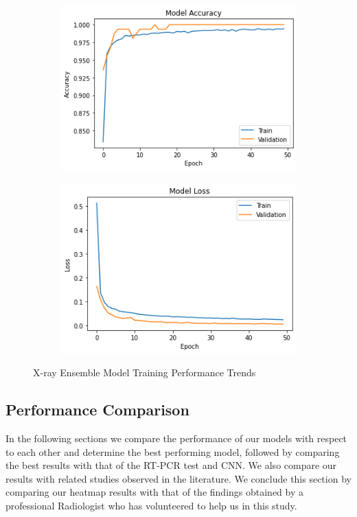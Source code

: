 \begin{figure}[H]
        \begin{subfigure}[b]{0.5\textwidth}
                \includegraphics[width=\linewidth]{Images/EnsembleXrayAcc.png}
        \end{subfigure}%
        \begin{subfigure}[b]{0.5\textwidth}
                \includegraphics[width=\linewidth]{Images/EnsembleXrayLoss.png}
        \end{subfigure}%
        \caption{X-ray Ensemble Model Training Performance Trends}\label{fig:xrayEnsembleModelTraining}
\end{figure}


\subsection{Performance Comparison}
In the following sections we compare the performance of our models with respect to each other and determine the best performing model, followed by comparing the best results with that of the RT-PCR test and CNN. We also compare our results with related studies observed in the literature. We conclude this section by comparing our heatmap results with that of the findings obtained by a professional Radiologist who has volunteered to help us in this study.

